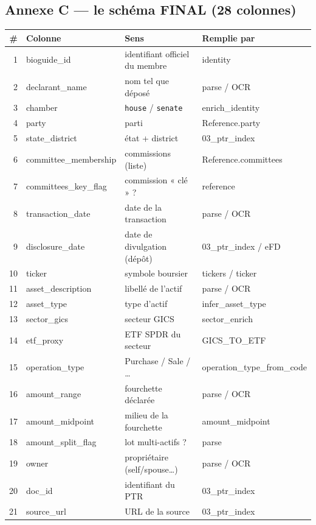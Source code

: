 \documentclass[11pt,a4paper]{article}
\newcommand{\co}[1]{\texttt{\small #1}}
\begin{document}
\subsection{Annexe C — le schéma FINAL (28 colonnes)}
\label{anx:schema}
{\footnotesize
\begin{longtable}{r >{\ttfamily}p{3.3cm} p{8.2cm} >{\ttfamily\scriptsize}p{3.0cm}}
\toprule
\# & \normalfont\bfseries Colonne & \bfseries Sens & \normalfont\bfseries Remplie par \\
\midrule\endhead
1 & bioguide_id & identifiant officiel du membre & identity \\
2 & declarant_name & nom tel que déposé & parse / OCR \\
3 & chamber & \co{house} / \co{senate} & enrich_identity \\
4 & party & parti & Reference.party \\
5 & state_district & état + district & 03\_ptr\_index \\
6 & committee_membership & commissions (liste) & Reference.committees \\
7 & committees_key_flag & commission « clé » ? & reference \\
8 & transaction_date & date de la transaction & parse / OCR \\
9 & disclosure_date & date de divulgation (dépôt) & 03\_ptr\_index / eFD \\
10 & ticker & symbole boursier & tickers / ticker \\
11 & asset_description & libellé de l'actif & parse / OCR \\
12 & asset_type & type d'actif & infer_asset_type \\
13 & sector_gics & secteur GICS & sector_enrich \\
14 & etf_proxy & ETF SPDR du secteur & GICS\_TO\_ETF \\
15 & operation_type & Purchase / Sale / … & operation_type_from_code \\
16 & amount_range & fourchette déclarée & parse / OCR \\
17 & amount_midpoint & milieu de la fourchette & amount_midpoint \\
18 & amount_split_flag & lot multi-actifs ? & parse \\
19 & owner & propriétaire (self/spouse…) & parse / OCR \\
20 & doc_id & identifiant du PTR & 03\_ptr\_index \\
21 & source_url & URL de la source & 03\_ptr\_index \\

\end{longtable}}
\end{document}
